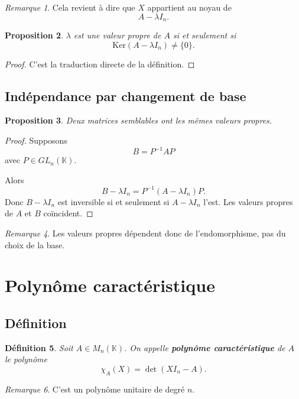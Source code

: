 \documentclass[11pt,a4paper]{article}
\newtheorem{definition}{Définition}[section]
\newtheorem{proposition}[definition]{Proposition}
\theoremstyle{remark}
\newtheorem{remarque}[definition]{Remarque}
\newcommand{\K}{\mathbb{K}}
\newcommand{\Ker}{\mathrm{Ker}}
\newcommand{\chiA}{\chi_A}
\begin{document}
\begin{remarque}
Cela revient à dire que \(X\) appartient au noyau de
\[
A-\lambda I_n.
\]
\end{remarque}

\begin{proposition}
\(\lambda\) est une valeur propre de \(A\) si et seulement si
\[
\Ker(A-\lambda I_n)\neq \{0\}.
\]
\end{proposition}

\begin{proof}
C’est la traduction directe de la définition.
\end{proof}

\subsection{Indépendance par changement de base}

\begin{proposition}
Deux matrices semblables ont les mêmes valeurs propres.
\end{proposition}

\begin{proof}
Supposons
\[
B=P^{-1}AP
\]
avec \(P\in GL_n(\K)\).

Alors
\[
B-\lambda I_n=P^{-1}(A-\lambda I_n)P.
\]
Donc \(B-\lambda I_n\) est inversible si et seulement si \(A-\lambda I_n\) l’est. Les valeurs propres de \(A\) et \(B\) coïncident.
\end{proof}

\begin{remarque}
Les valeurs propres dépendent donc de l’endomorphisme, pas du choix de la base.
\end{remarque}

\section{Polynôme caractéristique}

\subsection{Définition}

\begin{definition}
Soit \(A\in M_n(\K)\).  
On appelle \textbf{polynôme caractéristique} de \(A\) le polynôme
\[
\chiA(X)=\det(XI_n-A).
\]
\end{definition}

\begin{remarque}
C’est un polynôme unitaire de degré \(n\).
\end{remarque}
\end{document}
